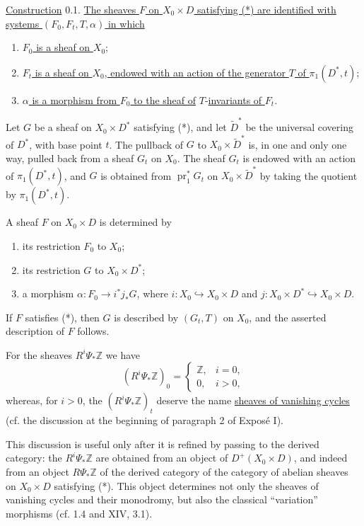 \underline{Construction} 0.1. \underline{The sheaves $F$ on
$X_0\times D$ satisfying (*) are identified with systems
$(F_0,F_t,T,\alpha)$ in which}
\begin{enumerate}[label=\alph*),leftmargin=2.5em]
\item \underline{$F_0$ is a sheaf on $X_0$};
\item \underline{$F_t$ is a sheaf on $X_0$, endowed with an action of
the generator $T$ of $\pi_1(D^*,t)$};
\item \underline{$\alpha$ is a morphism from $F_0$ to the sheaf of}
$T$-\underline{invariants of $F_t$}.
\end{enumerate}

Let $G$ be a sheaf on $X_0\times D^*$ satisfying (*), and let
$\widetilde D^*$ be the universal covering of $D^*$, with base point
$t$.  The pullback of $G$ to $X_0\times\widetilde D^*$ is, in one and
only one way, pulled back from a sheaf $G_t$ on $X_0$.  The sheaf $G_t$
is endowed with an action of $\pi_1(D^*,t)$, and $G$ is obtained from
$\operatorname{pr}_1^*G_t$ on $X_0\times\widetilde D^*$ by taking the
quotient by $\pi_1(D^*,t)$.

A sheaf $F$ on $X_0\times D$ is determined by
\begin{enumerate}[label=\arabic*),leftmargin=2.5em]
\item its restriction $F_0$ to $X_0$;
\item its restriction $G$ to $X_0\times D^*$;
\item a morphism $\alpha:F_0\longrightarrow i^*j_*G$, where
$i:X_0\hookrightarrow X_0\times D$ and
$j:X_0\times D^*\hookrightarrow X_0\times D$.
\end{enumerate}
If $F$ satisfies (*), then $G$ is described by $(G_t,T)$ on $X_0$, and
the asserted description of $F$ follows.

For the sheaves $R^i\Psi_*\mathbb Z$ we have
\begin{equation*}
(R^i\Psi_*\mathbb Z)_0=
\begin{cases}
\mathbb Z, & i=0,\\
0, & i>0,
\end{cases}
\end{equation*}
whereas, for $i>0$, the $(R^i\Psi_*\mathbb Z)_t$ deserve the name
\underline{sheaves of vanishing cycles} (cf. the discussion at the
beginning of paragraph 2 of Expos\'e I).


This discussion is useful only after it is refined by passing to the
derived category: the $R^i\Psi_*\mathbb Z$ are obtained from an object
of $D^+(X_0\times D)$, and indeed from an object
$R\Psi_*\mathbb Z$ of the derived category of the category of abelian
sheaves on $X_0\times D$ satisfying (*).  This object determines not
only the sheaves of vanishing cycles and their monodromy, but also the
classical ``variation'' morphisms (cf. 1.4 and XIV, 3.1).


